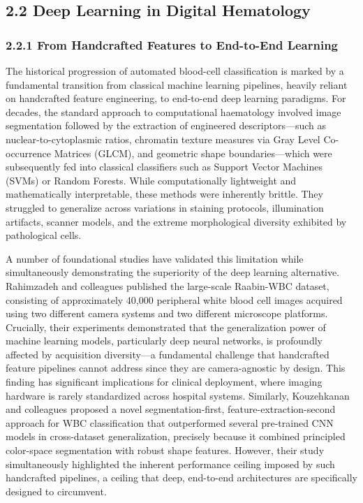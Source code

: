 \documentclass[11pt]{article}
\begin{document}
\subsection*{2.2 Deep Learning in Digital Hematology}

\subsubsection*{2.2.1 From Handcrafted Features to End-to-End Learning}

The historical progression of automated blood-cell classification is marked by a fundamental transition from classical machine learning pipelines, heavily reliant on handcrafted feature engineering, to end-to-end deep learning paradigms. For decades, the standard approach to computational haematology involved image segmentation followed by the extraction of engineered descriptors—such as nuclear-to-cytoplasmic ratios, chromatin texture measures via Gray Level Co-occurrence Matrices (GLCM), and geometric shape boundaries—which were subsequently fed into classical classifiers such as Support Vector Machines (SVMs) or Random Forests. While computationally lightweight and mathematically interpretable, these methods were inherently brittle. They struggled to generalize across variations in staining protocols, illumination artifacts, scanner models, and the extreme morphological diversity exhibited by pathological cells.

A number of foundational studies have validated this limitation while simultaneously demonstrating the superiority of the deep learning alternative. Rahimzadeh and colleagues \cite{rahimzadeh2021} published the large-scale Raabin-WBC dataset, consisting of approximately 40,000 peripheral white blood cell images acquired using two different camera systems and two different microscope platforms. Crucially, their experiments demonstrated that the generalization power of machine learning models, particularly deep neural networks, is profoundly affected by acquisition diversity—a fundamental challenge that handcrafted feature pipelines cannot address since they are camera-agnostic by design. This finding has significant implications for clinical deployment, where imaging hardware is rarely standardized across hospital systems. Similarly, Kouzehkanan and colleagues \cite{kouzehkanan2021} proposed a novel segmentation-first, feature-extraction-second approach for WBC classification that outperformed several pre-trained CNN models in cross-dataset generalization, precisely because it combined principled color-space segmentation with robust shape features. However, their study simultaneously highlighted the inherent performance ceiling imposed by such handcrafted pipelines, a ceiling that deep, end-to-end architectures are specifically designed to circumvent.
\end{document}
